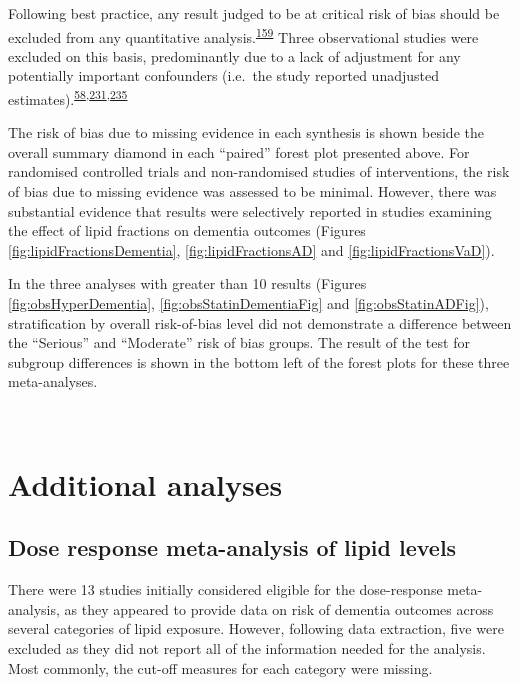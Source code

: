 \documentclass[a4paper, twoside]{templates/ociamthesis}
\begin{document}
Following best practice, any result judged to be at critical risk of bias should be excluded from any quantitative analysis.\textsuperscript{\protect\hyperlink{ref-sterne2016}{159}} Three observational studies were excluded on this basis, predominantly due to a lack of adjustment for any potentially important confounders (i.e.~the study reported unadjusted estimates).\textsuperscript{\protect\hyperlink{ref-mainous2005}{58},\protect\hyperlink{ref-kuo2015}{231},\protect\hyperlink{ref-notkola1998}{235}}

The risk of bias due to missing evidence in each synthesis is shown beside the overall summary diamond in each ``paired'' forest plot presented above. For randomised controlled trials and non-randomised studies of interventions, the risk of bias due to missing evidence was assessed to be minimal. However, there was substantial evidence that results were selectively reported in studies examining the effect of lipid fractions on dementia outcomes (Figures \ref{fig:lipidFractionsDementia}, \ref{fig:lipidFractionsAD} and \ref{fig:lipidFractionsVaD}).

In the three analyses with greater than 10 results (Figures \ref{fig:obsHyperDementia}, \ref{fig:obsStatinDementiaFig} and \ref{fig:obsStatinADFig}), stratification by overall risk-of-bias level did not demonstrate a difference between the ``Serious'' and ``Moderate'' risk of bias groups. The result of the test for subgroup differences is shown in the bottom left of the forest plots for these three meta-analyses.

~

\hypertarget{additional-analyses-1}{%
\section{Additional analyses}\label{additional-analyses-1}}

\hypertarget{dose-response-results}{%
\subsection{Dose response meta-analysis of lipid levels}\label{dose-response-results}}

There were 13 studies initially considered eligible for the dose-response meta-analysis, as they appeared to provide data on risk of dementia outcomes across several categories of lipid exposure. However, following data extraction, five were excluded as they did not report all of the information needed for the analysis. Most commonly, the cut-off measures for each category were missing.
\end{document}
